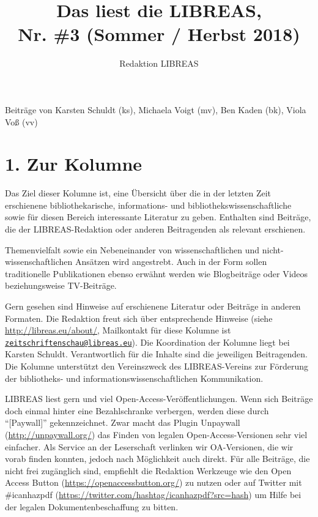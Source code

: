 \documentclass[a4paper,
fontsize=11pt,
oneside,
numbers=noperiodatend,
parskip=half-,
bibliography=totoc,
final
]{scrartcl}
\title{\LARGE{Das liest die LIBREAS, \\ Nr. \#3 (Sommer / Herbst 2018)}} %
\author{Redaktion LIBREAS} %
\date{}
\begin{document}
\maketitle
\thispagestyle{fancyplain} 


Beiträge von Karsten Schuldt (ks), Michaela Voigt (mv), Ben Kaden (bk),
Viola Voß (vv)

\hypertarget{zur-kolumne}{%
\section{1. Zur Kolumne}\label{zur-kolumne}}

Das Ziel dieser Kolumne ist, eine Übersicht über die in der letzten Zeit
erschienene bibliothekarische, informations- und
bibliothekswissenschaftliche sowie für diesen Bereich interessante
Literatur zu geben. Enthalten sind Beiträge, die der LIBREAS-Redaktion
oder anderen Beitragenden als relevant erschienen.

Themenvielfalt sowie ein Nebeneinander von wissenschaftlichen und
nicht-wissenschaftlichen Ansätzen wird angestrebt. Auch in der Form
sollen traditionelle Publikationen ebenso erwähnt werden wie
Blogbeiträge oder Videos beziehungsweise TV-Beiträge.

Gern gesehen sind Hinweise auf erschienene Literatur oder Beiträge in
anderen Formaten. Die Redaktion freut sich über entsprechende Hinweise
(siehe \url{http://libreas.eu/about/}, Mailkontakt für diese Kolumne ist
\href{mailto:zeitschriftenschau@libreas.eu}{\nolinkurl{zeitschriftenschau@libreas.eu}}).
Die Koordination der Kolumne liegt bei Karsten Schuldt. Verantwortlich
für die Inhalte sind die jeweiligen Beitragenden. Die Kolumne
unterstützt den Vereinszweck des LIBREAS-Vereins zur Förderung der
bibliotheks- und informationswissenschaftlichen Kommunikation.

LIBREAS liest gern und viel Open-Access-Veröffentlichungen. Wenn sich
Beiträge doch einmal hinter eine Bezahlschranke verbergen, werden diese
durch \enquote{{[}Paywall{]}} gekennzeichnet. Zwar macht das Plugin
Unpaywall (\url{http://unpaywall.org/}) das Finden von legalen
Open-Access-Versionen sehr viel einfacher. Als Service an der
Leserschaft verlinken wir OA-Versionen, die wir vorab finden konnten,
jedoch nach Möglichkeit auch direkt. Für alle Beiträge, die nicht frei
zugänglich sind, empfiehlt die Redaktion Werkzeuge wie den Open Access
Button (\url{https://openaccessbutton.org/}) zu nutzen oder auf Twitter
mit \#icanhazpdf (\url{https://twitter.com/hashtag/icanhazpdf?src=hash})
um Hilfe bei der legalen Dokumentenbeschaffung zu bitten.
\end{document}
